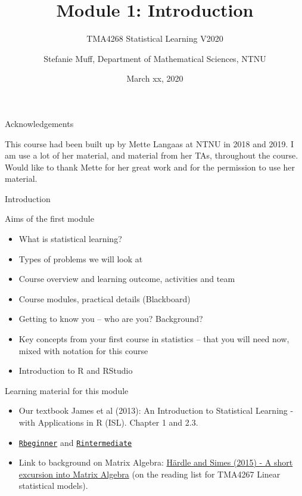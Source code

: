 \documentclass[10pt,ignorenonframetext,]{beamer}
\title{Module 1: Introduction}
\subtitle{TMA4268 Statistical Learning V2020}
\author{Stefanie Muff, Department of Mathematical Sciences, NTNU}
\date{March xx, 2020}
\begin{document}
\frame{\titlepage}

\begin{frame}{Acknowledgements}

This course had been built up by Mette Langaas at NTNU in 2018 and 2019.
I am use a lot of her material, and material from her TAs, throughout
the course. Would like to thank Mette for her great work and for the
permission to use her material.

\end{frame}

\begin{frame}{Introduction}

\begin{block}{Aims of the first module}

\begin{itemize}
\item
  What is statistical learning?
\item
  Types of problems we will look at
\item
  Course overview and learning outcome, activities and team
\item
  Course modules, practical details (Blackboard)
\item
  Getting to know you -- who are you? Background?
\item
  Key concepts from your first course in statistics -- that you will
  need now, mixed with notation for this course
\item
  Introduction to R and RStudio\\
\end{itemize}

\end{block}

\end{frame}

\begin{frame}

\begin{block}{Learning material for this module}

\begin{itemize}
\item
  Our textbook James et al (2013): An Introduction to Statistical
  Learning - with Applications in R (ISL). Chapter 1 and 2.3.
\item
  \href{https://www.math.ntnu.no/emner/TMA4268/2019v/1Intro/Rbeginner.html}{\texttt{Rbeginner}}
  and
  \href{https://www.math.ntnu.no/emner/TMA4268/2019v/1Intro/Rintermediate.html}{\texttt{Rintermediate}}
\item
  Link to background on Matrix Algebra:
  \href{https://link.springer.com/chapter/10.1007/978-3-662-45171-7_2}{Härdle
  and Simes (2015) - A short excursion into Matrix Algebra} (on the
  reading list for TMA4267 Linear statistical models).
\end{itemize}

\end{block}

\end{frame}
\end{document}
